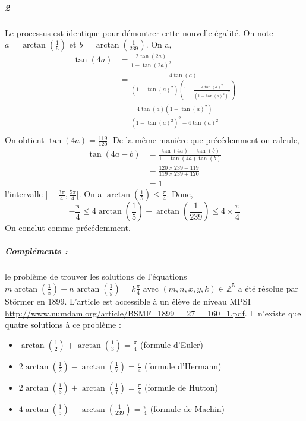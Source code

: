 \documentclass[10pt,a4paper]{article}
\begin{document}
\subparagraph{2}Le processus est identique pour démontrer cette nouvelle égalité.
On note  $a = \arctan \left( \frac{1}{5} \right)$ et $b = \arctan\left( \frac{1}{239}\right)$. On a,
\begin{equation}
\begin{aligned}
\tan(4a) &= \frac{2\tan(2a)}{1- \tan(2a)^2} \\
&= \frac{4\tan(a)}{(1-\tan(a)^2) \left( 1- \frac{4\tan(a)^2}{(1-\tan(a)^2)^2} \right)} \\
&= \frac{4\tan(a) (1- \tan(a)^2)}{\left(1-\tan(a)^2 \right)^2-4\tan(a)^2} \\
\end{aligned}
\end{equation}
On obtient $\tan(4a) = \frac{119}{120}$. De la même manière que précédemment on calcule,
\begin{equation}
\begin{aligned}
\tan(4a - b) &= \frac{\tan(4a) - \tan(b) }{1- \tan(4a)\tan(b)} \\
&= \frac{120 \times 239 - 119}{119 \times 239 + 120} \\
&=1
\end{aligned}
\end{equation}
l'intervalle $]-\frac{3\pi}{4}, \frac{5\pi}{4}[$.  On a $\arctan(\frac{1}{5}) \le \frac{\pi}{4}$. Donc,
\begin{equation}
-\frac{\pi}{4} \le 4\arctan(\frac{1}{5}) - \arctan(\frac{1}{239}) \le 4 \times \frac{\pi}{4}
\end{equation}
On conclut comme précédemment.

\subparagraph{Compléments :} le problème de trouver les solutions de l'équations $m \arctan  \left( \frac{1}{x} \right) + n \arctan \left( \frac{1}{y} \right) = k \frac{\pi}{4}$ avec $(m,n,x,y,k) \in \mathbb{Z}^5$ a été résolue par Störmer en 1899. L'article est accessible à un élève de niveau MPSI \url{http://www.numdam.org/article/BSMF_1899__27__160_1.pdf}. Il n'existe que quatre solutions à ce problème :
\begin{itemize}
\item $\arctan \left( \frac{1}{2} \right) + \arctan \left( \frac{1}{3} \right) = \frac{\pi}{4}$ (formule d'Euler)
\item $2 \arctan \left( \frac{1}{2} \right) - \arctan \left( \frac{1}{7} \right) = \frac{\pi}{4}$ (formule d'Hermann)
\item $2 \arctan \left( \frac{1}{3} \right) + \arctan \left( \frac{1}{7} \right) = \frac{\pi}{4}$ (formule de Hutton)
\item $4 \arctan \left( \frac{1}{5} \right) - \arctan \left( \frac{1}{239} \right) = \frac{\pi}{4}$ (formule de Machin)
\end{itemize}
\end{document}
